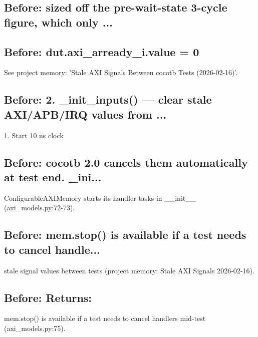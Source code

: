 \begin{record}

\subsection*{Before: sized off the pre-wait-state 3-cycle figure, which only ...}


\subsection*{Before: dut.axi\_arready\_i.value = 0}

\begin{textblock}
See project memory: 'Stale AXI Signals Between cocotb Tests (2026-02-16)'.
\end{textblock}

\subsection*{Before: 2. \_init\_inputs() — clear stale AXI/APB/IRQ values from ...}

\begin{textblock}
1. Start 10 ns clock
\end{textblock}

\subsection*{Before: cocotb 2.0 cancels them automatically at test end.  \_ini...}

\begin{textblock}
ConfigurableAXIMemory starts its handler tasks in __init__ (axi_models.py:72-73).
\end{textblock}

\subsection*{Before: mem.stop() is available if a test needs to cancel handle...}

\begin{textblock}
stale signal values between tests (project memory: Stale AXI Signals 2026-02-16).
\end{textblock}

\subsection*{Before: Returns:}

\begin{textblock}
mem.stop() is available if a test needs to cancel handlers mid-test (axi_models.py:75).
\end{textblock}

\end{record}

